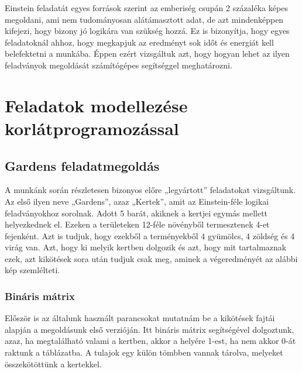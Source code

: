 \documentclass[12pt,a4paper,twoside, openright]{report}
\begin{document}
    Einstein feladatát egyes források szerint az emberiség csupán 2 százaléka képes megoldani, ami nem tudományosan alátámasztott adat, de azt mindenképpen kifejezi, hogy bizony jó logikára van szükség hozzá.
    Ez is bizonyítja, hogy egyes feladatoknál ahhoz, hogy megkapjuk az eredményt sok időt és energiát kell belefektetni a munkába.
    Éppen ezért vizsgáltuk azt, hogy hogyan lehet az ilyen feladványok megoldását számítógépes segítséggel meghatározni.


\chapter{Feladatok modellezése korlátprogramozással}

\section{Gardens feladatmegoldás} 

    A munkánk során részletesen bizonyos előre „legyártott” feladatokat vizsgáltunk.
    Az első ilyen neve „Gardens”, azaz „Kertek”, amit az Einstein-féle logikai feladványokhoz sorolnak\cite{gardens}.
    Adott 5 barát, akiknek a kertjei egymás mellett helyezkednek el.
    Ezeken a területeken 12-féle növényből termesztenek 4-et fejenként.
    Azt is tudjuk, hogy ezekből a terményekből 4 gyümölcs, 4 zöldség és 4 virág van.
    Azt, hogy ki melyik kertben dolgozik és azt, hogy mit tartalmaznak ezek, azt kikötések sora után tudjuk csak meg, aminek a végeredményét az alábbi kép szemlélteti.


\subsection{Bináris mátrix}

    Először is az általunk használt parancsokat mutatnám be a kikötések fajtái alapján a megoldásunk első verzióján.
    Itt bináris mátrix segítségével dolgoztunk, azaz, ha megtalálható valami a kertben, akkor a helyére 1-est, ha nem akkor 0-át raktunk a táblázatba.
    A tulajok egy külön tömbben vannak tárolva, melyeket összekötöttünk a kertekkel.
	
\end{document}
